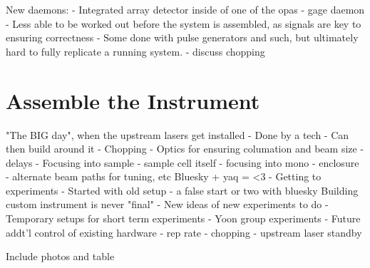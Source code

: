    New daemons:
   - Integrated array detector inside of one of the opas
   - gage daemon
      - Less able to be worked out before the system is assembled, as signals are key to ensuring correctness
      - Some done with pulse generators and such, but ultimately hard to fully replicate a running system.
      - discuss chopping

\clearpage

\section{Assemble the Instrument}  %

"The BIG day", when the upstream lasers get installed
   - Done by a tech
   - Can then build around it
      - Chopping
      - Optics for ensuring columation and beam size
      - delays
      - Focusing into sample
      - sample cell itself
      - focusing into mono
      - enclosure
      - alternate beam paths for tuning, etc
Bluesky + yaq = <3
   - Getting to experiments
   - Started with old setup
   - a false start or two with bluesky
Building custom instrument is never "final"
  - New ideas of new experiments to do
  - Temporary setups for short term experiments
     - Yoon group experiments
  - Future addt'l control of existing hardware
     - rep rate
     - chopping
     - upstream laser standby

Include photos and table

